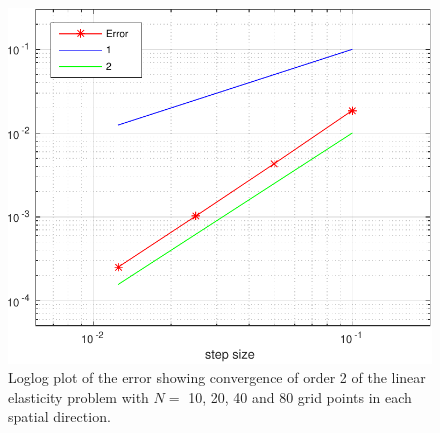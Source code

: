 \begin{figure}[ht]
\center
\includegraphics[scale=0.5]{conv_linEl}
\caption{Loglog plot of the error showing convergence of order 2 of the linear elasticity problem with $N =$ 10, 20, 40 and 80 grid points in each spatial direction. }
\label{convergence}
\end{figure}

